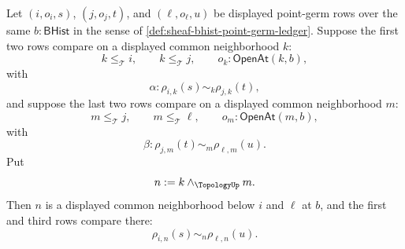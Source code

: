 \begin{theorem}
\label{thm:sheaf-bhist-point-germ-comparison-transitivity}
Let $(i,o_i,s)$, $(j,o_j,t)$, and $(\ell,o_\ell,u)$ be displayed point-germ rows over the same $b:\mathsf{BHist}$ in the sense of \autoref{def:sheaf-bhist-point-germ-ledger}. Suppose the first two rows compare on a displayed common neighborhood $k$:
$$
k\le_{\mathcal{T}}i,
\qquad
k\le_{\mathcal{T}}j,
\qquad
o_k:\mathsf{OpenAt}(k,b),
$$
with
$$
\alpha:\rho_{i,k}(s)\sim_k\rho_{j,k}(t),
$$
and suppose the last two rows compare on a displayed common neighborhood $m$:
$$
m\le_{\mathcal{T}}j,
\qquad
m\le_{\mathcal{T}}\ell,
\qquad
o_m:\mathsf{OpenAt}(m,b),
$$
with
$$
\beta:\rho_{j,m}(t)\sim_m\rho_{\ell,m}(u).
$$
Put
$$
n:=k\wedge_{\TopologyUp}m.
$$
Then $n$ is a displayed common neighborhood below $i$ and $\ell$ at $b$, and the first and third rows compare there:
$$
\rho_{i,n}(s)\sim_n\rho_{\ell,n}(u).
$$
\end{theorem}
